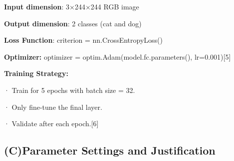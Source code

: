 \begin{Shaded}
\begin{Highlighting}[]
\OperatorTok{=}\OperatorTok{=}\OperatorTok{=}\OperatorTok{=}\NormalTok{)}
\OperatorTok{=}\NormalTok{)}
\NormalTok{, }\OperatorTok{=}\NormalTok{(}\NormalTok{, }\OperatorTok{=}\NormalTok{(}\NormalTok{, }\OperatorTok{=}\NormalTok{(}\NormalTok{, }\OperatorTok{=}\NormalTok{)}
\OperatorTok{=}\OperatorTok{=}\OperatorTok{=}\OperatorTok{=}\NormalTok{)}
\NormalTok{    )}
\NormalTok{  )}

\OperatorTok{=}\NormalTok{(}\NormalTok{, }\NormalTok{))}
\OperatorTok{=}\OperatorTok{=}\OperatorTok{=}\NormalTok{)}
\NormalTok{)}
\end{Highlighting}
\end{Shaded}

\textbf{Input dimension}: 3×244×244 RGB image

\textbf{Output dimension}: 2 classes (cat and dog)

\textbf{Loss Function}: criterion = nn.CrossEntropyLoss()

\textbf{Optimizer:} optimizer = optim.Adam(model.fc.parameters(),
lr=0.001){[}5{]}

\textbf{Training Strategy:}

· Train for 5 epochs with batch size = 32.

· Only fine-tune the final layer.

· Validate after each epoch.{[}6{]}

\subsection{\texorpdfstring{\textbf{(C)Parameter Settings and
Justification}}{(C)Parameter Settings and Justification}}\label{cparameter-settings-and-justification}


